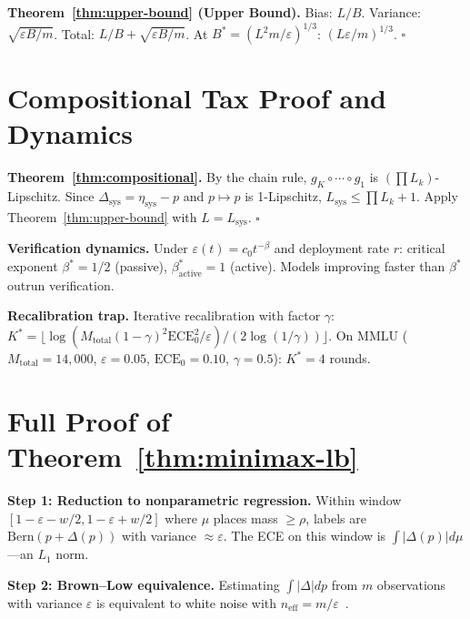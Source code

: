 \documentclass{article}
\newcommand{\ECE}{\mathrm{ECE}}
\newcommand{\Lip}{L}
\newcommand{\errrate}{\varepsilon}
\newcommand{\nsamples}{m}
\newcommand{\calmapraw}{\eta}
\newcommand{\calmap}{\Delta}
\newcommand{\scoredist}{\mu}
\newcommand{\Bern}{\mathrm{Bern}}
\newcommand{\totaldata}{M_{\mathrm{total}}}
\newcommand{\deployrate}{r}
\newcommand{\critexp}{\beta}
\newcommand{\recalround}{K}
\newcommand{\shrinkfactor}{\gamma}
\newcommand{\Lsystem}{L_{\mathrm{sys}}}
\newcommand{\tvdrift}{\rho}
\theoremstyle{definition}
\begin{document}
\textbf{Theorem~\ref{thm:upper-bound} (Upper Bound).}
Bias: $\Lip/B$. Variance: $\sqrt{\errrate B/\nsamples}$. Total: $\Lip/B + \sqrt{\errrate B/\nsamples}$. At $B^* = (\Lip^2\nsamples/\errrate)^{1/3}$: $(\Lip\errrate/\nsamples)^{1/3}$. $\square$

\section{Compositional Tax Proof and Dynamics}
\label{app:compositional}

\textbf{Theorem~\ref{thm:compositional}.} By the chain rule, $g_\recalround \circ \cdots \circ g_1$ is $(\prod L_k)$-Lipschitz. Since $\calmap_{\mathrm{sys}} = \calmapraw_{\mathrm{sys}} - p$ and $p \mapsto p$ is 1-Lipschitz, $\Lsystem \leq \prod L_k + 1$. Apply Theorem~\ref{thm:upper-bound} with $\Lip = \Lsystem$. $\square$

\textbf{Verification dynamics.} Under $\errrate(t) = c_0 t^{-\critexp}$ and deployment rate $\deployrate$: critical exponent $\critexp^* = 1/2$ (passive), $\critexp^*_{\mathrm{active}} = 1$ (active). Models improving faster than $\critexp^*$ outrun verification.

\textbf{Recalibration trap.} Iterative recalibration with factor $\shrinkfactor$: $K^* = \lfloor\log(\totaldata(1-\shrinkfactor)^2\ECE_0^2/\errrate)/(2\log(1/\shrinkfactor))\rfloor$. On MMLU ($\totaldata=14{,}000$, $\errrate=0.05$, $\ECE_0=0.10$, $\shrinkfactor=0.5$): $K^* = 4$ rounds.


\section{Full Proof of Theorem~\ref{thm:minimax-lb}}
\label{app:minimax-proof}

\textbf{Step 1: Reduction to nonparametric regression.}
Within window $[1{-}\errrate{-}w/2, 1{-}\errrate{+}w/2]$ where $\scoredist$ places mass $\geq \tvdrift$, labels are $\Bern(p + \calmap(p))$ with variance $\approx \errrate$. The ECE on this window is $\int |\calmap(p)| d\scoredist$---an $L_1$ norm.

\textbf{Step 2: Brown--Low equivalence.}
Estimating $\int|\calmap|dp$ from $\nsamples$ observations with variance $\errrate$ is equivalent to white noise with $n_{\mathrm{eff}} = \nsamples/\errrate$~\citep{brown1996equivalence}.
\end{document}
